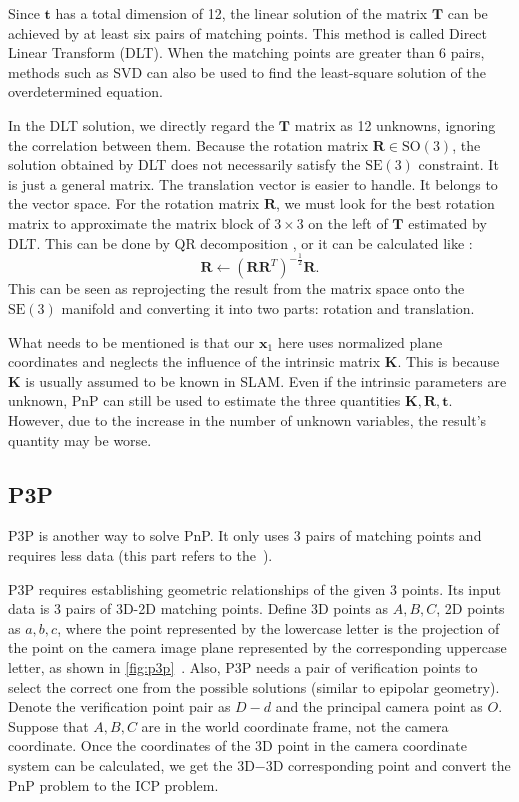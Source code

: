 Since $\mathbf{t}$ has a total dimension of 12, the linear solution of the matrix $\mathbf{T}$ can be achieved by at least six pairs of matching points. This method is called Direct Linear Transform (DLT). When the matching points are greater than 6 pairs, methods such as SVD can also be used to find the least-square solution of the overdetermined equation.

In the DLT solution, we directly regard the $\mathbf{T}$ matrix as 12 unknowns, ignoring the correlation between them. Because the rotation matrix $\mathbf{R} \in \mathrm{SO}(3)$, the solution obtained by DLT does not necessarily satisfy the $\mathrm{SE}(3)$ constraint. It is just a general matrix. The translation vector is easier to handle. It belongs to the vector space. For the rotation matrix $\mathbf{R}$, we must look for the best rotation matrix to approximate the matrix block of $3 \times 3$ on the left of $\mathbf{T}$ estimated by DLT. This can be done by QR decomposition  {\cite{Hartley2003, Chen1994}}, or it can be calculated like {\cite{Barfoot2016,Green1952}}:
\begin{equation}
\mathbf{R} \leftarrow {\left( {\mathbf{R}{\mathbf{R}^T}} \right)^{ - \frac{1}{2}}} \mathbf{R}.
\end{equation}
This can be seen as reprojecting the result from the matrix space onto the $\mathrm{SE}(3)$ manifold and converting it into two parts: rotation and translation.

What needs to be mentioned is that our $\mathbf{x}_1$ here uses normalized plane coordinates and neglects the influence of the intrinsic matrix $\mathbf{K}$. This is because $\mathbf{K}$ is usually assumed to be known in SLAM. Even if the intrinsic parameters are unknown, PnP can still be used to estimate the three quantities $\mathbf{K}, \mathbf{R}, \mathbf{t}$. However, due to the increase in the number of unknown variables, the result's quantity may be worse.

\subsection{P3P}
P3P is another way to solve PnP. It only uses 3 pairs of matching points and requires less data (this part refers to the~\cite{web:p3p}).

P3P requires establishing geometric relationships of the given 3 points. Its input data is 3 pairs of 3D-2D matching points. Define 3D points as $A, B, C$, 2D points as $a, b, c$, where the point represented by the lowercase letter is the projection of the point on the camera image plane represented by the corresponding uppercase letter, as shown in \autoref{fig:p3p}~. Also, P3P needs a pair of verification points to select the correct one from the possible solutions (similar to epipolar geometry). Denote the verification point pair as $D-d$ and the principal camera point as $O$. Suppose that $A, B, C$ are in the world coordinate frame, not the camera coordinate. Once the coordinates of the 3D point in the camera coordinate system can be calculated, we get the 3D−3D corresponding point and convert the PnP problem to the ICP problem.

